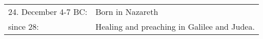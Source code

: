 

\newcommand{\cvdist}{5mm}

\vspace{1.5cm}
\begin{tabular}{p{4cm} p{10cm}}%
24. December 4-7 BC: & Born in Nazareth \\[\cvdist]%
since 28: & Healing and preaching in Galilee and Judea. \\[\cvdist]%
\end{tabular}%
%
